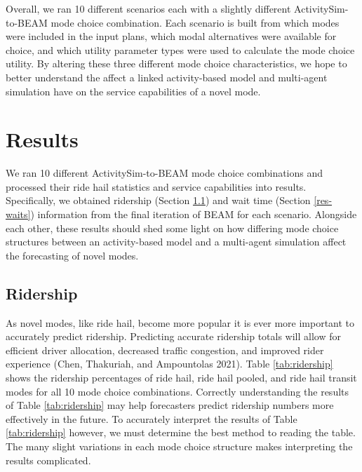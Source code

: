 \documentclass[12pt, oneside, openright]{byuthesis}
\begin{document}
Overall, we ran 10 different scenarios each with a slightly different ActivitySim-to-BEAM mode choice combination. Each scenario is built from which modes were included in the input plans, which modal alternatives were available for choice, and which utility parameter types were used to calculate the mode choice utility. By altering these three different mode choice characteristics, we hope to better understand the affect a linked activity-based model and multi-agent simulation have on the service capabilities of a novel mode.

\hypertarget{results}{%
\chapter{Results}\label{results}}

We ran 10 different ActivitySim-to-BEAM mode choice combinations and processed their ride hail statistics and service capabilities into results. Specifically, we obtained ridership (Section \ref{res-ridership}) and wait time (Section \ref{res-waits}) information from the final iteration of BEAM for each scenario. Alongside each other, these results should shed some light on how differing mode choice structures between an activity-based model and a multi-agent simulation affect the forecasting of novel modes.

\hypertarget{res-ridership}{%
\section{Ridership}\label{res-ridership}}

As novel modes, like ride hail, become more popular it is ever more important to accurately predict ridership. Predicting accurate ridership totals will allow for efficient driver allocation, decreased traffic congestion, and improved rider experience (Chen, Thakuriah, and Ampountolas 2021). Table \ref{tab:ridership} shows the ridership percentages of ride hail, ride hail pooled, and ride hail transit modes for all 10 mode choice combinations. Correctly understanding the results of Table \ref{tab:ridership} may help forecasters predict ridership numbers more effectively in the future. To accurately interpret the results of Table \ref{tab:ridership} however, we must determine the best method to reading the table. The many slight variations in each mode choice structure makes interpreting the results complicated.
\end{document}
